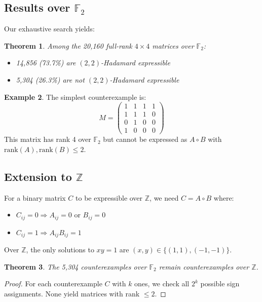 \documentclass[11pt]{amsart}
\theoremstyle{plain}
\newtheorem{theorem}{Theorem}
\theoremstyle{definition}
\newtheorem{example}[theorem]{Example}
\theoremstyle{remark}
\begin{document}
\subsection{Results over $\mathbb{F}_2$}

Our exhaustive search yields:

\begin{theorem}
Among the 20,160 full-rank $4 \times 4$ matrices over $\mathbb{F}_2$:
\begin{itemize}
\item 14,856 (73.7\%) are $(2,2)$-Hadamard expressible
\item 5,304 (26.3\%) are not $(2,2)$-Hadamard expressible
\end{itemize}
\end{theorem}

\begin{example}
The simplest counterexample is:
\[
M = \begin{pmatrix}
1 & 1 & 1 & 1 \\
1 & 1 & 1 & 0 \\
0 & 1 & 0 & 0 \\
1 & 0 & 0 & 0
\end{pmatrix}
\]
This matrix has rank 4 over $\mathbb{F}_2$ but cannot be expressed as $A \circ B$ with $\mathrm{rank}(A), \mathrm{rank}(B) \leq 2$.
\end{example}

\subsection{Extension to $\mathbb{Z}$}

For a binary matrix $C$ to be expressible over $\mathbb{Z}$, we need $C = A \circ B$ where:
\begin{itemize}
\item $C_{ij} = 0 \Rightarrow A_{ij} = 0$ or $B_{ij} = 0$
\item $C_{ij} = 1 \Rightarrow A_{ij}B_{ij} = 1$
\end{itemize}

Over $\mathbb{Z}$, the only solutions to $xy = 1$ are $(x,y) \in \{(1,1), (-1,-1)\}$.

\begin{theorem}
The 5,304 counterexamples over $\mathbb{F}_2$ remain counterexamples over $\mathbb{Z}$.
\end{theorem}

\begin{proof}
For each counterexample $C$ with $k$ ones, we check all $2^k$ possible sign assignments. None yield matrices with rank $\leq 2$.
\end{proof}
\end{document}
